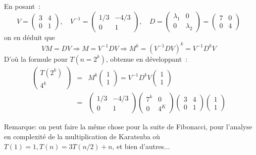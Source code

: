\documentclass[a4paper]{article}
\begin{document}
En posant~: 
$$ V=\left(\begin{array}{cc}
3 & 4 \\
0 & 1 
\end{array}\right), \quad V^{-1}=\left(\begin{array}{cc}
1/3 & -4/3 \\
0 & 1
\end{array}\right), \quad D=\left(\begin{array}{cc}
 \lambda_1 & 0 \\
0 & \lambda_2
\end{array}\right)=\left(\begin{array}{cc}
7  & 0 \\
0 &  4
\end{array}\right)$$
on en déduit que 
$$VM=DV \Rightarrow M=V^{-1}D V \Rightarrow M^k= (V^{-1}D V)^k=V^{-1}D^kV
$$ 
D'où la formule pour $T(n=2^k)$, obtenue en développant~: 
\begin{eqnarray}
\left(\begin{array}{c}
T(2^k) \\
4^k
\end{array}\right) &=&  M^k\left(\begin{array}{c}
1 \\
1
\end{array}\right) = V^{-1}D^kV\left(\begin{array}{c}
1 \\
1
\end{array}\right) \\
&=& \left(\begin{array}{cc}
1/3 & -4/3 \\
0 & 1
\end{array}\right) \left(\begin{array}{cc}
7 ^ k & 0 \\
0 & 4^ K
\end{array}\right) \left(\begin{array}{cc} 3 & 4 \\
0 & 1
\end{array}\right)\left(\begin{array}{c}
1 \\
1
\end{array}\right)
\end{eqnarray}

Remarque: on peut faire la même chose pour la suite de Fibonacci, pour l'analyse en complexité de
la multiplication de Karatsuba où $T(1)=1, T(n)=3 T(n/2)+ n$, et bien d'autres... 
\end{document}
